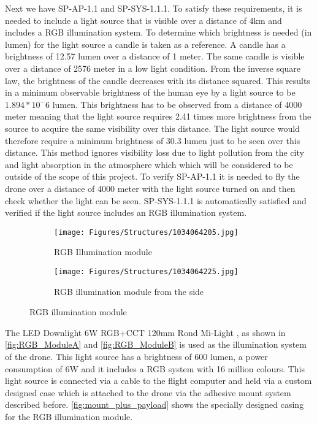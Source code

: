 Next we have SP-AP-1.1 and SP-SYS-1.1.1. To satisfy these requirements, it is needed to include a light source that is visible over a distance of 4km and includes a RGB illumination system. To determine which brightness is needed (in lumen) for the light source a candle is taken as a reference. A candle has a brightness of 12.57 lumen over a distance of 1 meter\cite{candlebrightness}. The same candle is visible over a distance of 2576 meter in a low light condition\cite{candledistance}. From the inverse square law, the brightness of the candle decreases with its distance squared. This results in a minimum observable brightness of the human eye by a light source to be $1.894*10^-6$ lumen. This brightness has to be observed from a distance of 4000 meter meaning that the light source requires 2.41 times more brightness from the source to acquire the same visibility over this distance. The light source would therefore require a minimum brightness of 30.3 lumen just to be seen over this distance. This method ignores visibility loss due to light pollution from the city and light absorption in the atmosphere which which will be considered to be outside of the scope of this project. To verify SP-AP-1.1\label{req:SP-SYS-1.1} it is needed to fly the drone over a distance of 4000 meter with the light source turned on and then check whether the light can be seen. SP-SYS-1.1.1\label{req:SP-SYS-1.1.1} is automatically satisfied and verified if the light source includes an RGB illumination system.

\begin{figure}[h]
     \centering
     \begin{subfigure}{0.28\textwidth}
         \centering
         \texttt{[image: Figures/Structures/1034064205.jpg]}
         \caption{RGB Illumination module}
         \label{fig:RGB_ModuleA}
     \end{subfigure}
     \hspace{3cm}
     \begin{subfigure}{0.28\textwidth}
         \centering
         \texttt{[image: Figures/Structures/1034064225.jpg]}
         \caption{RGB illumination module from the side}
         \label{fig:mount_plus_payload}
     \end{subfigure}
     \hfill
     \caption{RGB illumination module\cite{RGBlight}}
     \label{fig:RGB_ModuleB}
\end{figure}


The LED Downlight 6W RGB+CCT 120mm Rond Mi-Light \cite{RGBlight}, as shown in \autoref{fig:RGB_ModuleA} and \autoref{fig:RGB_ModuleB} is used as the illumination system of the drone. This light source has a brightness of 600 lumen, a power consumption of 6W and it includes a RGB system with 16 million colours. This light source is connected via a cable to the flight computer and held via a custom designed case which is attached to the drone via the adhesive mount system described before. \autoref{fig:mount_plus_payload} shows the specially designed casing for the RGB illumination module.



